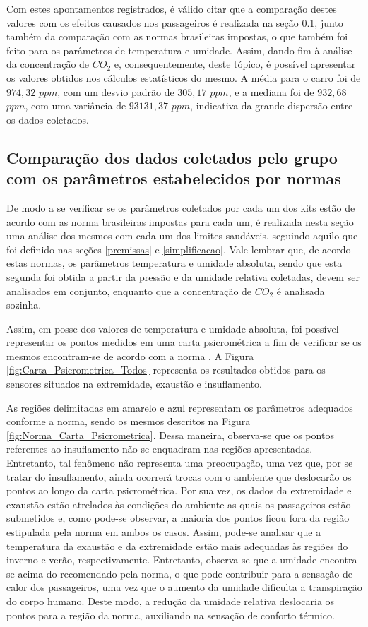 \documentclass[acronym,symbols,table]{fei}
\begin{document}
Com estes apontamentos registrados, é válido citar que a comparação destes valores com os efeitos causados nos passageiros é realizada na seção \ref{comparagrupo}, junto também da comparação com as normas brasileiras impostas, o que também foi feito para os parâmetros de temperatura e umidade. Assim, dando fim à análise da concentração de ${CO}_{2}$ e, consequentemente, deste tópico, é possível apresentar os valores obtidos nos cálculos estatísticos do mesmo. A média para o carro foi de  $974,32$ $ppm$, com um desvio padrão de $305,17$ $ppm$, e a mediana foi de $932,68$ $ppm$, com uma variância de $93131,37$ $ppm$, indicativa da grande dispersão entre os dados coletados.

\subsection{Comparação dos dados coletados pelo grupo com os parâmetros estabelecidos por normas} \label{comparagrupo}

De modo a se verificar se os parâmetros coletados por cada um dos kits estão de acordo com as norma brasileiras impostas para cada um, é realizada nesta seção uma análise dos mesmos com cada um dos limites saudáveis, seguindo aquilo que foi definido nas seções \ref{premissas} e \ref{simplificacao}. Vale lembrar que, de acordo estas normas, os parâmetros temperatura e umidade absoluta, sendo que esta segunda foi obtida a partir da pressão e da umidade relativa coletadas, devem ser analisados em conjunto, enquanto que a concentração de ${CO}_{2}$ é analisada sozinha.

Assim, em posse dos valores de temperatura e umidade absoluta, foi possível representar os pontos medidos em uma carta psicrométrica a fim de verificar se os mesmos encontram-se de acordo com a norma \textcite{abnt216401}. A Figura \ref{fig:Carta_Psicrometrica_Todos} representa os resultados obtidos para os sensores situados na extremidade, exaustão e insuflamento.

As regiões delimitadas em amarelo e azul representam os parâmetros adequados conforme a norma, sendo os mesmos descritos na Figura \ref{fig:Norma_Carta_Psicrometrica}. Dessa maneira, observa-se que os pontos referentes ao insuflamento não se enquadram nas regiões apresentadas. Entretanto, tal fenômeno não representa uma preocupação, uma vez que, por se tratar do insuflamento, ainda ocorrerá trocas com o ambiente que deslocarão os pontos ao longo da carta psicrométrica. Por sua vez, os dados da extremidade e exaustão estão atrelados às condições do ambiente as quais os passageiros estão submetidos e, como pode-se observar, a maioria dos pontos ficou fora da região estipulada pela norma em ambos os casos. Assim, pode-se analisar que a temperatura da exaustão e da extremidade estão mais adequadas às regiões do inverno e verão, respectivamente. Entretanto, observa-se que a umidade encontra-se acima do recomendado pela norma, o que pode contribuir para a sensação de calor dos passageiros, uma vez que o aumento da umidade dificulta a transpiração do corpo humano. Deste modo, a redução da umidade relativa deslocaria os pontos para a região da norma, auxiliando na sensação de conforto térmico.
\end{document}
